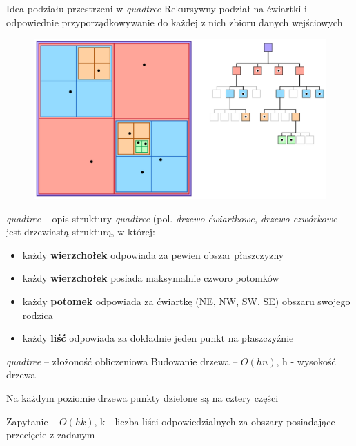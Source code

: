 \documentclass{beamer}
\begin{document}
\begin{frame}{Idea podziału przestrzeni w \textit{quadtree}}
Rekursywny podział na ćwiartki i odpowiednie przyporządkowywanie do każdej z nich zbioru danych wejściowych
\begin{figure}
    \centering
    \includegraphics[width=\linewidth]{quadtree_image.png}
    \label{fig:quadtre}
\end{figure}

\end{frame}

\begin{frame}{\textit{quadtree} -- opis struktury}
    \textit{quadtree} (pol. \textit{drzewo ćwiartkowe, drzewo czwórkowe} jest drzewiastą strukturą, w której:
    \begin{itemize}
        \item <2-> każdy \textbf{wierzchołek} odpowiada za pewien obszar płaszczyzny
        \item <3-> każdy \textbf{wierzchołek} posiada maksymalnie czworo potomków
        \item <4-> każdy \textbf{potomek} odpowiada za ćwiartkę (NE, NW, SW, SE) obszaru swojego rodzica
        \item <5-> każdy \textbf{liść} odpowiada za dokładnie jeden punkt na płaszczyźnie
    \end{itemize}
\end{frame}

\begin{frame}{\textit{quadtree} -- złożoność obliczeniowa}
Budowanie drzewa -- $O(hn)$, h - wysokość drzewa

Na każdym poziomie drzewa punkty dzielone są na cztery części

Zapytanie -- $O(hk)$, k - liczba liści odpowiedzialnych za obszary posiadające przecięcie z zadanym
    
\end{frame}
\end{document}
